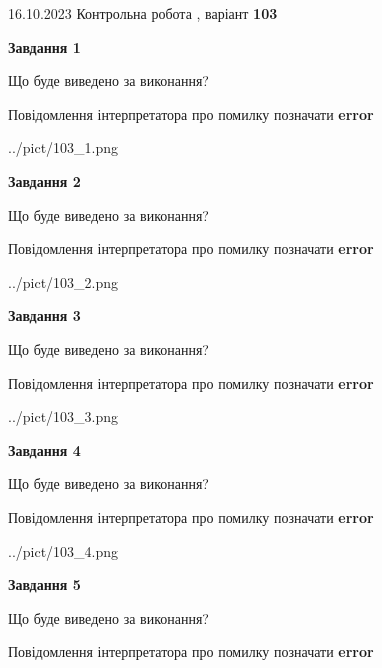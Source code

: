 \documentclass[12pt, ukrainian]{article}
\begin{document}
{\Large{16.10.2023 Контрольна робота , варіант  \No \textbf { 103 }\par}}
{
\begin {large}
{\begin {center}\textbf{Завдання 1}\end {center}}\par
Що буде виведено за виконання? \par
Повідомлення інтерпретатора про помилку позначати \textbf{error}

\begin{center}
	{../pict/103_1.png}
\end{center}
\newpage

{\begin {center}\textbf{Завдання 2}\end {center}}\par
Що буде виведено за виконання? \par
Повідомлення інтерпретатора про помилку позначати \textbf{error}

\begin{center}
	{../pict/103_2.png}
\end{center}
\newpage

{\begin {center}\textbf{Завдання 3}\end {center}}\par
Що буде виведено за виконання? \par
Повідомлення інтерпретатора про помилку позначати \textbf{error}

\begin{center}
	{../pict/103_3.png}
\end{center}
\newpage

{\begin {center}\textbf{Завдання 4}\end {center}}\par
Що буде виведено за виконання? \par
Повідомлення інтерпретатора про помилку позначати \textbf{error}

\begin{center}
	{../pict/103_4.png}
\end{center}
\newpage

{\begin {center}\textbf{Завдання 5}\end {center}}\par
Що буде виведено за виконання? \par
Повідомлення інтерпретатора про помилку позначати \textbf{error}


\end{large}}
\end{document}
